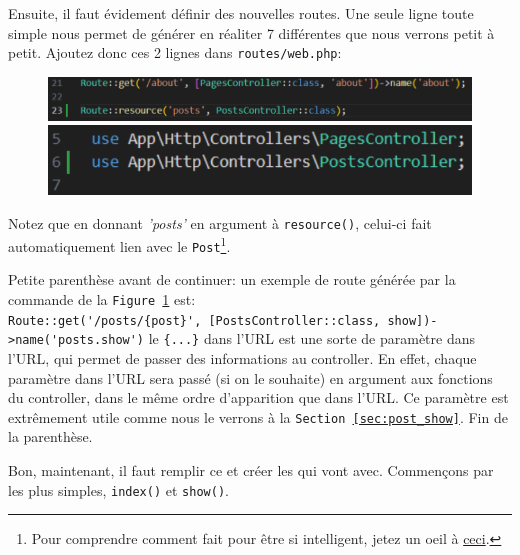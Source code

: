 Ensuite, il faut évidement définir des nouvelles routes. Une seule ligne toute simple nous permet de générer en réaliter 7 \routes{} différentes que nous verrons petit à petit. Ajoutez donc ces 2 lignes dans \verb|routes/web.php|:

\begin{figure}[!h]
    \centering
    \begin{minipage}{0.6\textwidth}
        \centering
        \includegraphics[width=\textwidth]{figures-C1/res_route_1.pdf}
        \caption{\label{fig:post_route}}
    \end{minipage}
    \begin{minipage}{0.38\textwidth}
        \centering
        \includegraphics[width=\textwidth]{figures-C1/res_route_2.pdf}
        \caption{}
    \end{minipage}
\end{figure}
\vspace{-0.5cm}
Notez que en donnant \textit{'posts'} en argument à \verb|resource()|, celui-ci fait automatiquement lien avec le \model{} \verb|Post|\footnote{Pour comprendre comment \laravel{} fait pour être si intelligent, jetez un oeil à \href{https://laravel.com/docs/10.x/eloquent#table-names}{ceci}.}.

Petite parenthèse avant de continuer: un exemple de route générée par la commande de la \texttt{Figure~\ref{fig:post_route}} est: \\
\verb|Route::get('/posts/{post}', [PostsController::class, show])->name('posts.show')|
le \verb|{...}| dans l'URL est une sorte de paramètre dans l'URL, qui permet de passer des informations au controller. En effet, chaque paramètre dans l'URL sera passé (si on le souhaite) en argument aux fonctions du controller, dans le même ordre d'apparition que dans l'URL. Ce paramètre est extrêmement utile comme nous le verrons à la \texttt{Section~\ref{sec:post_show}}. Fin de la parenthèse.

Bon, maintenant, il faut remplir ce \controller{} et créer les \views{} qui vont avec. Commençons par les plus simples, \verb|index()| et \verb|show()|.

